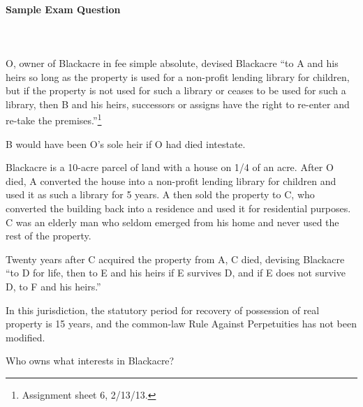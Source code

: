 \paragraph{Sample Exam Question}
~\\\\
O, owner of Blackacre in fee simple absolute, devised Blackacre ``to A and his 
heirs so long as the property is used for a non-profit lending library for 
children, but if the property is not used for such a library or ceases to be 
used for such a library, then B and his heirs, successors or assigns have the 
right to re-enter and re-take the premises.''\footnote{Assignment sheet 6, 
2/13/13.}

B would have been O's sole heir if O had died intestate.

Blackacre is a 10-acre parcel of land with a house on 1/4 of an acre. After O 
died, A converted the house into a non-profit lending library for children and 
used it as such a library for 5 years. A then sold the property to C, who 
converted the building back into a residence and used it for residential 
purposes. C was an elderly man who seldom emerged from his home and never used 
the rest of the property.

Twenty years after C acquired the property from A, C died, devising Blackacre 
``to D for life, then to E and his heirs if E survives D, and if E does not 
survive D, to F and his heirs.''

In this jurisdiction, the statutory period for recovery of possession of real 
property is 15 years, and the common-law Rule Against Perpetuities has not 
been modified.

Who owns what interests in Blackacre?

